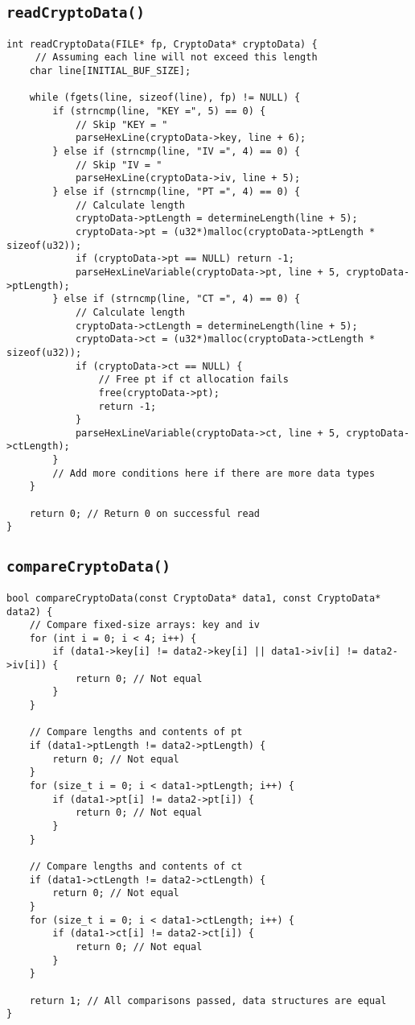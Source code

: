 \subsection{\texttt{readCryptoData()}}
\begin{lstlisting}[style=C]
int readCryptoData(FILE* fp, CryptoData* cryptoData) {
	 // Assuming each line will not exceed this length
	char line[INITIAL_BUF_SIZE];
	
	while (fgets(line, sizeof(line), fp) != NULL) {
		if (strncmp(line, "KEY =", 5) == 0) {
			// Skip "KEY = "
			parseHexLine(cryptoData->key, line + 6);
		} else if (strncmp(line, "IV =", 4) == 0) {
		 	// Skip "IV = "
			parseHexLine(cryptoData->iv, line + 5);
		} else if (strncmp(line, "PT =", 4) == 0) {
		 	// Calculate length
			cryptoData->ptLength = determineLength(line + 5);
			cryptoData->pt = (u32*)malloc(cryptoData->ptLength * sizeof(u32));
			if (cryptoData->pt == NULL) return -1;
			parseHexLineVariable(cryptoData->pt, line + 5, cryptoData->ptLength);
		} else if (strncmp(line, "CT =", 4) == 0) {
			// Calculate length
			cryptoData->ctLength = determineLength(line + 5);
			cryptoData->ct = (u32*)malloc(cryptoData->ctLength * sizeof(u32));
			if (cryptoData->ct == NULL) {
				// Free pt if ct allocation fails
				free(cryptoData->pt);
				return -1;
			}
			parseHexLineVariable(cryptoData->ct, line + 5, cryptoData->ctLength);
		}
		// Add more conditions here if there are more data types
	}
	
	return 0; // Return 0 on successful read
}	
\end{lstlisting}

\newpage
\subsection{\texttt{compareCryptoData()}}
\begin{lstlisting}[style=C]
bool compareCryptoData(const CryptoData* data1, const CryptoData* data2) {
	// Compare fixed-size arrays: key and iv
	for (int i = 0; i < 4; i++) {
		if (data1->key[i] != data2->key[i] || data1->iv[i] != data2->iv[i]) {
			return 0; // Not equal
		}
	}
	
	// Compare lengths and contents of pt
	if (data1->ptLength != data2->ptLength) {
		return 0; // Not equal
	}
	for (size_t i = 0; i < data1->ptLength; i++) {
		if (data1->pt[i] != data2->pt[i]) {
			return 0; // Not equal
		}
	}
	
	// Compare lengths and contents of ct
	if (data1->ctLength != data2->ctLength) {
		return 0; // Not equal
	}
	for (size_t i = 0; i < data1->ctLength; i++) {
		if (data1->ct[i] != data2->ct[i]) {
			return 0; // Not equal
		}
	}
	
	return 1; // All comparisons passed, data structures are equal
}
\end{lstlisting}

